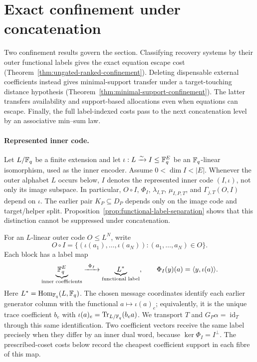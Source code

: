 \section{Exact confinement under concatenation}
\label{sec:confinement}

Two confinement results govern the section.  Classifying recovery systems by
their outer functional labels gives the exact equation escape cost
(Theorem~\ref{thm:ungated-ranked-confinement}).  Deleting dispensable external
coefficients instead gives minimal-support transfer under a target-touching
distance hypothesis (Theorem~\ref{thm:minimal-support-confinement}).  The latter
transfers availability and support-based allocations even when equations can
escape.  Finally, the full label-indexed costs pass to the next concatenation
level by an associative min--sum law.

\paragraph{Represented inner code.}
Let $L/\mathbb F_q$ be a finite extension and let
$\iota:L\xrightarrow{\sim} I\leq\mathbb F_q^E$ be an $\mathbb F_q$-linear isomorphism,
used as the inner encoder.
Assume $0<\dim I<|E|$.
Whenever the outer alphabet $L$ occurs below, $I$ denotes the represented
inner code $(I,\iota)$, not only its image subspace.  In particular,
$O\circ I$, $\Phi_I$, $\lambda_{I,T}$, $\mu_{I,P,T}$, and
$\Gamma_{j,T}(O,I)$ depend on $\iota$.  The earlier pair
$K_P\subseteq D_P$ depends only on the image code and target/helper split.
Proposition~\ref{prop:functional-label-separation} shows that this distinction
cannot be suppressed under concatenation.

For an $L$-linear outer code $O\leq L^N$, write
\[
 O\circ I=\{(\iota(a_1),\ldots,\iota(a_N)):(a_1,\ldots,a_N)\in O\}.
\]
Each block has a label map
\[
 \underbrace{\mathbb F_q^E}_{\text{inner coefficients}}
 \xrightarrow{\ \Phi_I\ }
 \underbrace{L^*}_{\text{functional label}},
\qquad
\Phi_I(y)(a)=\langle y,\iota(a)\rangle.
\]
Here $L^*=\operatorname{Hom}_{\mathbb F_q}(L,\mathbb F_q)$.  The chosen message coordinates
identify each earlier generator column with the functional
$a\mapsto\iota(a)_e$; equivalently, it is the unique trace coefficient $b_e$
with $\iota(a)_e=\operatorname{Tr}_{L/\mathbb F_q}(b_ea)$.  We transport $T$ and
$G_P\alpha=\operatorname{id}_T$ through this same identification.
Two coefficient vectors receive the same label precisely when they differ by
an inner dual word, because $\ker\Phi_I=I^\perp$.  The prescribed-coset costs
below record the cheapest coefficient support in each fibre of this map.

